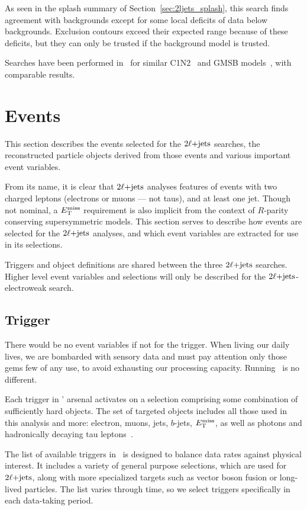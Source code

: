 As seen in the splash summary of Section~\ref{sec:2ljets_splash}, this search
finds agreement with backgrounds except for some local deficits of data below
backgrounds.
Exclusion contours exceed their expected range because of these deficits,
but they can only be trusted if the background model is trusted.

Searches have been performed in \cms\ for similar
C1N2~\cite{cms_susy_2022_c1n2} and GMSB models~\cite{
cms_susy_2018_partial_run2_combination,
cms_susy_2022_gmsb
}, with comparable results.


\section{Events}
This section describes the events selected for the $2\ell\mathrm{+jets}$ searches, the
reconstructed particle objects derived from those events and various
important event variables.

From its name, it is clear that $2\ell\mathrm{+jets}$ analyses features of events with
two charged leptons (electrons or muons --- not taus), and at least one jet.
Though not nominal, a $E_\mathrm{T}^\mathrm{miss}$ requirement is also implicit from the context
of $R$-parity conserving supersymmetric models.
This section serves to describe how events are selected for the $2\ell\mathrm{+jets}$
analyses, and which event variables are extracted for use in its selections.

Triggers and object definitions are shared between the three $2\ell\mathrm{+jets}$
searches.
Higher level event variables and selections will only be described for the
$2\ell\mathrm{+jets}$-electroweak search.

\subsection{Trigger}
\label{sec:2ljets_trigger}
There would be no event variables if not for the trigger.
When living our daily lives, we are bombarded with sensory data and must pay
attention only those gems few of any use, to avoid exhausting our
processing capacity.
Running \atlas\ is no different.

Each trigger in \atlas' arsenal activates on a selection comprising some
combination of sufficiently hard objects.
The set of targeted objects includes all those used in this analysis and more:
electron, muons, jets, $b$-jets, $E_\mathrm{T}^\mathrm{miss}$, as well as photons and hadronically
decaying tau leptons~\cite{atlas_PERF_2007_01}.

The list of available triggers in \atlas\ is designed to balance data rates
against physical interest.
It includes a variety of general purpose selections, which are used for
$2\ell\mathrm{+jets}$, along with more specialized targets such as vector boson fusion
or long-lived particles.
The list varies through time, so we select triggers specifically in
each data-taking period.

